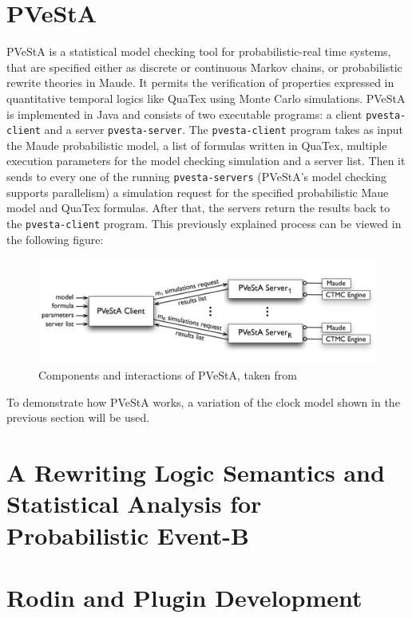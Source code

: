 \section{PVeStA}
PVeStA \cite{AlTurki2011} is a statistical model checking tool for probabilistic-real time systems, that are specified either as discrete or continuous Markov chains, or probabilistic rewrite theories in Maude. It permits the verification of properties expressed in quantitative temporal logics like QuaTex \cite{Agha2006} using Monte Carlo simulations.
PVeStA is implemented in Java and consists of two executable programs: a client \texttt{pvesta-client} and a server \texttt{pvesta-server}. The \texttt{pvesta-client} program takes as input the Maude probabilistic model, a list of formulas written in QuaTex, multiple execution parameters for the model checking simulation and a server list. Then it sends to every one of the running \texttt{pvesta-servers} (PVeStA's model checking supports parallelism) a simulation request for the specified probabilistic Maue model and QuaTex formulas. After that, the servers return the results back to the \texttt{pvesta-client} program. This previously explained process can be viewed in the following figure:
\begin{figure}[h]
    \centering
    \includegraphics[scale = 0.3]{images/pvesta.PNG}
    \caption{Components and interactions of PVeStA, taken from \cite{AlTurki2011}}
    \label{fig:pvesta}
\end{figure}
To demonstrate how PVeStA works, a variation of the clock model shown in the previous section will be used. 






\section{A Rewriting Logic Semantics and Statistical Analysis for Probabilistic Event-B}

\section{Rodin and Plugin Development}










